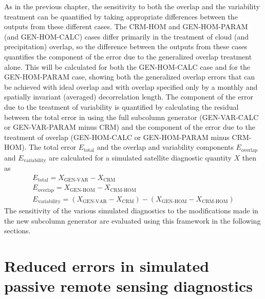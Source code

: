 As in the previous chapter, the sensitivity to both the overlap and the
variability treatment can be quantified by taking appropriate
differences between the outputs from these different cases. The CRM-HOM
and GEN-HOM-PARAM (and GEN-HOM-CALC) cases differ primarily in the
treatment of cloud (and precipitation) overlap, so the difference
between the outputs from these cases quantifies the component of the
error due to the generalized overlap treatment alone. This will be
calculated for both the GEN-HOM-CALC case and for the GEN-HOM-PARAM
case, showing both the generalized overlap errors that can be achieved
with ideal overlap and with overlap specified only by a monthly and
spatially invariant (averaged) decorrelation length. The component of
the error due to the treatment of variability is quantified by
calculating the residual between the total error in using the full
subcolumn generator (GEN-VAR-CALC or GEN-VAR-PARAM minus CRM) and the
component of the error due to the treatment of overlap (GEN-HOM-CALC or
GEN-HOM-PARAM minus CRM-HOM). The total error \(E_\textrm{total}\) and
the overlap and variability components \(E_\textrm{overlap}\) and
\(E_\textrm{variability}\) are calculated for a simulated satellite
diagnostic quantity \(X\) then as \[\begin{gathered} E_\textrm{total} =
X_\textrm{GEN-VAR} - X_\textrm{CRM} \\ E_\textrm{overlap} = X_\textrm{GEN-HOM} -
X_\textrm{CRM-HOM} \\ E_\textrm{variability} = (X_\textrm{GEN-VAR} -
X_\textrm{CRM}) - (X_\textrm{GEN-HOM} - X_\textrm{CRM-HOM})\end{gathered}\]
The sensitivity of the various simulated diagnostics to the
modifications made in the new subcolumn generator are evaluated using
this framework in the following sections.

\section{Reduced errors in simulated passive remote sensing
diagnostics}\label{sec:subgrid2Passive}

